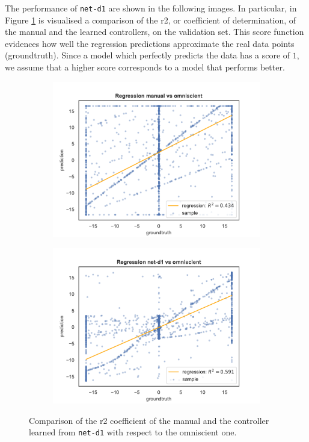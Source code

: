 The performance of \texttt{net-d1} are shown in the following images. In 
particular, in Figure \ref{fig:net-d1r2} is visualised a comparison of the \gls{r2}, 
or coefficient of determination, of the manual and the learned controllers, on the 
validation set.
This score function evidences how well the regression predictions approximate 
the real data points (groundtruth). Since a model which perfectly predicts the data 
has a score of $1$, we assume that a higher score corresponds to a model that 
performs better.
\begin{figure}[!htb]
	\centering
	\begin{subfigure}[h]{0.49\textwidth}
		\centering
		\includegraphics[width=\textwidth]{contents/images/net-d1/regression-manualvsomniscient}%
	\end{subfigure}
	\hfill
	\begin{subfigure}[h]{0.49\textwidth}
		\centering
		\includegraphics[width=\textwidth]{contents/images/net-d1/regression-net-d1-vs-omniscient}
	\end{subfigure}
	\caption[Evaluation of the \gls{r2} coefficients of \texttt{net-d1} 
	.]{Comparison of 
	the \gls{r2} coefficient of the manual and the controller learned from 
	\texttt{net-d1} with respect to the omniscient one.}
	\label{fig:net-d1r2}
\end{figure}
